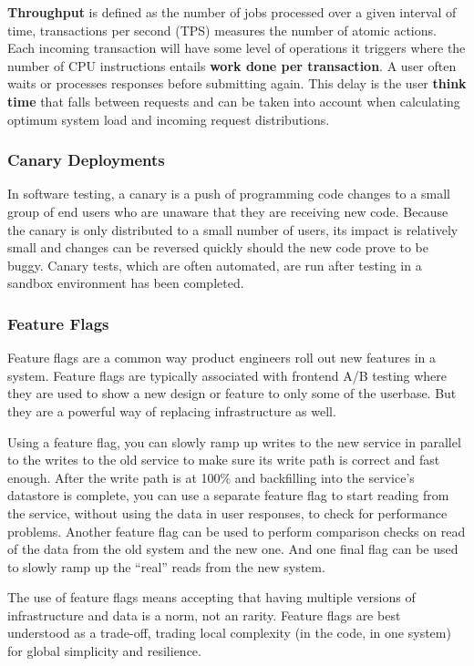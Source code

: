 \documentclass{article}
\begin{document}
    \textbf{Throughput} is defined as the number of jobs processed over a given interval of time, transactions per second (TPS) measures the number of atomic actions. Each incoming transaction will have some level of operations it triggers where the number of CPU instructions entails \textbf{work done per transaction}. A user often waits or processes responses before submitting again. This delay is the user \textbf{think time} that falls between requests and can be taken into account when calculating optimum system load and incoming request distributions.
    
    \subsubsection{Canary Deployments}
    In software testing, a canary is a push of programming code changes to a small group of end users who are unaware that they are receiving new code. Because the canary is only distributed to a small number of users, its impact is relatively small and changes can be reversed quickly should the new code prove to be buggy. Canary tests, which are often automated, are run after testing in a sandbox environment has been completed.
    
    \subsubsection{Feature Flags}
    Feature flags are a common way product engineers roll out new features in a system. Feature flags are typically associated with frontend A/B testing where they are used to show a new design or feature to only some of the userbase. But they are a powerful way of replacing infrastructure as well.
    
    Using a feature flag, you can slowly ramp up writes to the new service in parallel to the writes to the old service to make sure its write path is correct and fast enough. After the write path is at 100\% and backfilling into the service’s datastore is complete, you can use a separate feature flag to start reading from the service, without using the data in user responses, to check for performance problems. Another feature flag can be used to perform comparison checks on read of the data from the old system and the new one. And one final flag can be used to slowly ramp up the ``real” reads from the new system.

    The use of feature flags means accepting that having multiple versions of infrastructure and data is a norm, not an rarity. Feature flags are best understood as a trade-off, trading local complexity (in the code, in one system) for global simplicity and resilience. 
    
\end{document}
